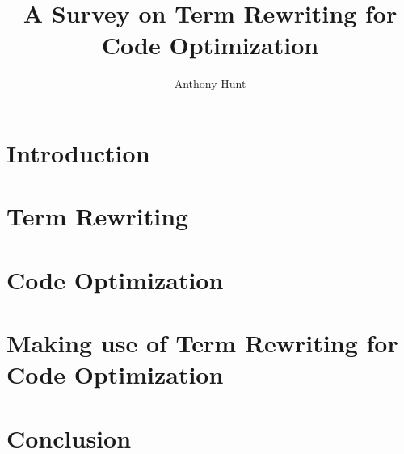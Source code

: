 \documentclass{article}
\title{A Survey on Term Rewriting for Code Optimization}
\author{Anthony Hunt}
\begin{document}
\maketitle
\tableofcontents

\section{Introduction}
\section{Term Rewriting}
\section{Code Optimization}
\section{Making use of Term Rewriting for Code Optimization} %
\section{Conclusion}


\pagebreak
\nocite{*} %
\printbibliography %
\end{document}

